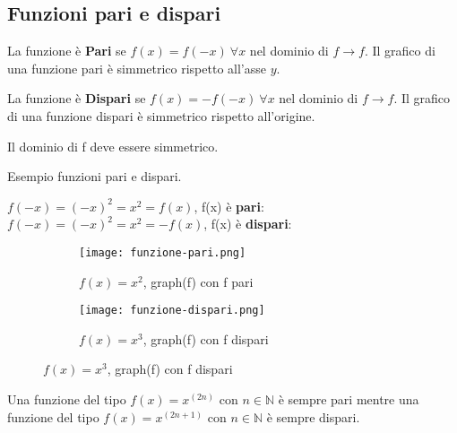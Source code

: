 \subsection{Funzioni pari e dispari}
\begin{definition}[Pari]
    La funzione è \textbf{Pari} se $f(x) = f(-x) \: \forall x$ nel dominio di $f \longrightarrow f$. Il grafico di una funzione pari è simmetrico rispetto all'asse $y$.
\end{definition}
\begin{definition}[Dispari]
    La funzione è \textbf{Dispari} se $f(x) = -f(-x) \: \forall x$ nel dominio di $f \longrightarrow f$. Il grafico di una funzione dispari è simmetrico rispetto all'origine.
\end{definition}
\begin{note}
    Il dominio di f deve essere simmetrico.\\
\end{note}
\begin{example}
Esempio funzioni pari e dispari.\\
\end{example}
$f(-x) = (-x)^2 = x^2 = f(x)$, f(x) è \textbf{pari}: \hfill $f(-x) = (-x)^2 = x^2 = -f(x)$, f(x) è \textbf{dispari}:
\begin{figure}[h!]
    \vspace{-1pt}
    \begin{subfigure}{.5\textwidth}
        \centering
        \texttt{[image: funzione-pari.png]}
        \caption{$f(x) = x^2$, \hspace{.2cm} graph(f) con f pari}
    \end{subfigure}
    \begin{subfigure}{.5\textwidth}
        \centering
        \texttt{[image: funzione-dispari.png]}
        \caption{$f(x) = x^3$, \hspace{.2cm} graph(f) con f dispari}
    \end{subfigure}
\end{figure}
\begin{note}
	Una funzione del tipo $f(x)=x^(2n)$ con $n \in \mathbb{N}$ è sempre pari mentre una funzione del tipo $f(x)=x^(2n+1)$ con $n \in \mathbb{N}$ è sempre dispari.
\end{note}

